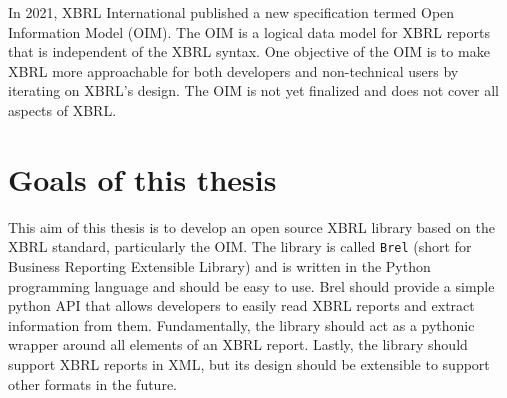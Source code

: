 In 2021, XBRL International published a new specification termed Open Information Model (OIM)\cite{oim}.
The OIM is a logical data model for XBRL reports that is independent of the XBRL syntax.
One objective of the OIM is to make XBRL more approachable for both developers and non-technical users by iterating on XBRL's design.
The OIM is not yet finalized and does not cover all aspects of XBRL. 


\section{Goals of this thesis}
\label{sec:goals}

This aim of this thesis is to develop an open source XBRL library based on the XBRL standard, particularly the OIM.
The library is called \texttt{Brel} (short for Business Reporting Extensible Library) and is written in the Python programming language and should be easy to use.
Brel should provide a simple python API that allows developers to easily read XBRL reports and extract information from them.
Fundamentally, the library should act as a pythonic wrapper around all elements of an XBRL report.
Lastly, the library should support XBRL reports in XML, but its design should be extensible to support other formats in the future.


